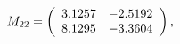 \begin{equation}
M_{22}=
\left(
\begin{array}{c c}
3.1257&
-2.5192\\
8.1295&
-3.3604\\
\end{array}
\right),
\end{equation}

